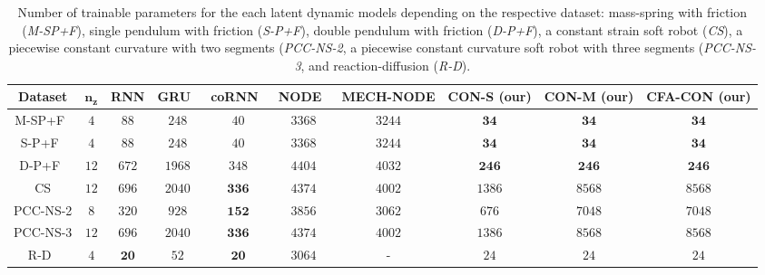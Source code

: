 \begin{landscape}
\begin{table}
    \centering
    \begin{scriptsize}
    \setlength\tabcolsep{2.5pt}
    \begin{tabular}{c|c|c|c|c|c|c|c|c|c}
        \toprule
        \textbf{Dataset} & $\mathbf{n_z}$ & \textbf{RNN} & \textbf{GRU}~\citep{cho2014learning} & \textbf{coRNN}~\citep{rusch2020coupled} & \textbf{NODE}~\citep{chen2018neural} & \textbf{MECH-NODE} & \textbf{CON-S (our)} & \textbf{CON-M (our)} & \textbf{CFA-CON (our)}\\
        \midrule
        M-SP+F~\citep{botev2021priors} & $4$ & $88$ & $248$ & $40$ & $3368$ & $3244$ & $\mathbf{34}$ & $\mathbf{34}$ & $\mathbf{34}$\\
        S-P+F~\citep{botev2021priors} & $4$ & $88$ & $248$ & $40$ & $3368$ & $3244$ & $\mathbf{34}$ & $\mathbf{34}$ & $\mathbf{34}$\\
        D-P+F~\citep{botev2021priors} & $12$ & $672$ & $1968$ & $348$ & $4404$ & $4032$ & $\mathbf{246}$ & $\mathbf{246}$ & $\mathbf{246}$\\
        CS & $12$ & $696$ & $2040$ & $\mathbf{336}$ & $4374$ & $4002$ & $1386$ & $8568$ & $8568$\\
        PCC-NS-2 & $8$ & $320$ & $928$ & $\mathbf{152}$ & $3856$ & $3062$ & $676$ & $7048$ & $7048$\\
        PCC-NS-3 & $12$ & $696$ & $2040$ & $\mathbf{336}$ & $4374$ & $4002$ & $1386$ & $8568$ & $8568$\\
        R-D~\citep{champion2019data} & $4$ & $\mathbf{20}$ & $52$ & $\mathbf{20}$ & $3064$ & - & $24$ & $24$ & $24$\\
        \bottomrule
    \end{tabular}
    \end{scriptsize}
    \caption{Number of trainable parameters for the each latent dynamic models depending on the respective dataset: mass-spring with friction (\emph{M-SP+F}), single pendulum with friction (\emph{S-P+F}), double pendulum with friction (\emph{D-P+F}), a constant strain soft robot (\emph{CS}), a piecewise constant curvature with two segments (\emph{PCC-NS-2}, a piecewise constant curvature soft robot with three segments (\emph{PCC-NS-3}, and reaction-diffusion (\emph{R-D}).}
    \label{tab:con:latent_dynamics_number_of_parameters}
\end{table}
\end{landscape}


